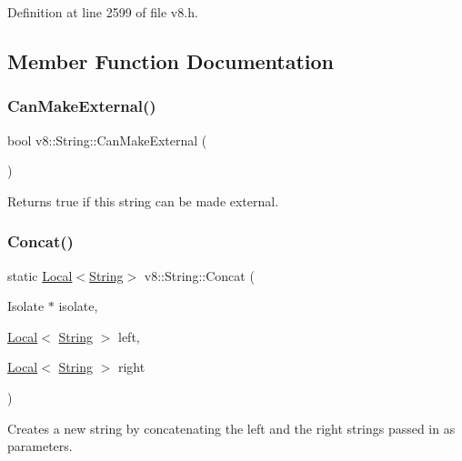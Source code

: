 Definition at line 2599 of file v8.\+h.



\subsection{Member Function Documentation}
\mbox{\label{classv8_1_1String_a0fe076838af046506ffebbfadcde812a}} 
\subsubsection{\texorpdfstring{Can\+Make\+External()}{CanMakeExternal()}}
{\footnotesize\ttfamily bool v8\+::\+String\+::\+Can\+Make\+External (\begin{DoxyParamCaption}{ }\end{DoxyParamCaption})}

Returns true if this string can be made external. \mbox{\label{classv8_1_1String_a757cf6ba6e17164fc962c1051c068c58}} 
\subsubsection{\texorpdfstring{Concat()}{Concat()}}
{\footnotesize\ttfamily static \mbox{\hyperlink{classv8_1_1Local}{Local}}$<$\mbox{\hyperlink{classv8_1_1String}{String}}$>$ v8\+::\+String\+::\+Concat (\begin{DoxyParamCaption}\item[{Isolate $\ast$}]{isolate,  }\item[{\mbox{\hyperlink{classv8_1_1Local}{Local}}$<$ \mbox{\hyperlink{classv8_1_1String}{String}} $>$}]{left,  }\item[{\mbox{\hyperlink{classv8_1_1Local}{Local}}$<$ \mbox{\hyperlink{classv8_1_1String}{String}} $>$}]{right }\end{DoxyParamCaption})\hspace{0.3cm}{\ttfamily [static]}}

Creates a new string by concatenating the left and the right strings passed in as parameters. \mbox{\label{classv8_1_1String_a29b9bc5f71fba74af478e806b9d6a1d6}} 
